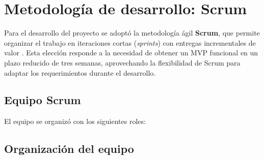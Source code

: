 
\section{Metodología de desarrollo: Scrum}

Para el desarrollo del proyecto se adoptó la metodología ágil \textbf{Scrum},
que permite organizar el trabajo en iteraciones cortas (\textit{sprints}) con
entregas incrementales de valor \citep{schwaber2020, beck2001}. Esta elección
responde a la necesidad de obtener un MVP funcional en un plazo reducido de
tres semanas, aprovechando la flexibilidad de Scrum para adaptar los
requerimientos durante el desarrollo.

\subsection{Equipo Scrum}

El equipo se organizó con los siguientes roles:

\begin{table}[H]
  \centering
  \caption{Roles del equipo Scrum}
\end{table}

\subsection{Organización del equipo}

